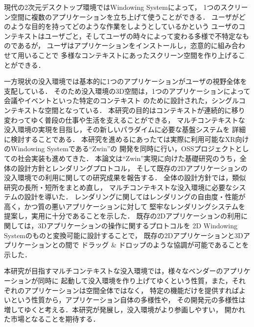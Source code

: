 現代の2次元デスクトップ環境ではWindowing Systemによって，
1つのスクリーン空間に複数のアプリケーションを立ち上げて使うことができる．
ユーザがどのような目的を持ってどのような作業をしようとしているかという
ユーザのコンテキストはユーザごと，そしてユーザの時々によって変わる多様で不特定なものであるが，
ユーザはアプリケーションをインストールし，恣意的に組み合わせて用いることで
多様なコンテキストにあったスクリーン空間を作り上げることができる．

一方現状の没入環境では基本的に1つのアプリケーションがユーザの視野全体を支配している．
そのため没入環境の3D空間は，1つのアプリケーションによって会議やイベントといった特定のコンテキスト
のために設計された，シングルコンテキストな空間となっている．
本研究の目的はコンテキストが連続的に移り変わってゆく普段の仕事や生活を支えることができる，
マルチコンテキストな没入環境の実現を目指し，その新しいパラダイムに必要な基盤システムを
詳細に検討することである．
本研究を進めるにあったては実際に利用可能なXR向けのWindowing Systemである``Zwin''の
開発を同時に行い，OSSプロジェクトとしての社会実装も進めてきた．
本論文は``Zwin''実現に向けた基礎研究のうち，全体の設計方針とレンダリングプロトコル，
そして既存の2Dアプリケーションの没入環境での利用に関しての研究成果を報告する．
全体の設計方針では，類似研究の長所・短所をまとめ直し，
マルチコンテキストな没入環境に必要なシステムの設計を導いた．
レンダリングに関してはレンダリングの自由度・性能が高く，かつ質の悪いアプリケーションに対して
堅牢なレンダリングシステムを提案し，実用に十分であることを示した．
既存の2Dアプリケーションの利用に関しては，3Dアプリケーションの操作に関するプロトコルを
2D Windowing Systemのものと変換可能に設計することで，
既存の2Dアプリケーションと3Dアプリケーションとの間で
ドラッグ \& ドロップのような協調が可能であることを示した．

本研究が目指すマルチコンテキストな没入環境では，様々なベンダーのアプリケーションが同時に
起動して没入環境を作り上げてゆくという性質，また，それぞれのアプリケーションは空間全体ではなく，
特定の機能だけを提供すればよいという性質から，アプリケーション自体の多様性や，
その開発元の多様性は増してゆくと考える．本研究が発展し，没入環境がより参画しやすい，
開かれた市場となることを期待する．
